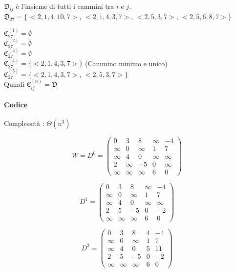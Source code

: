 \documentclass[tikz]{article}
\let\oldparagraph\paragraph
\renewcommand{\paragraph}[1]{\oldparagraph{#1}\mbox{}}
\begin{document}
{{$\mathfrak{D}_{ij}$ è l'insieme di tutti i cammini tra $i$ e $j$. \\
$\mathfrak{D}_{27} = \{\,<2,1,4,10,7>,\,<2,1,4,3,7>,\, <2,5,3,7>,\, <2,5,6,8,7>\}$ 

$\mathfrak{C}_{27}^{(1)} = \emptyset$ \\ 
$\mathfrak{C}_{27}^{(2)} = \emptyset$ \\ 
$\mathfrak{C}_{27}^{(3)} = \emptyset$ \\ 
$\mathfrak{C}_{27}^{(4)} = \{<2,1,4,3,7>\}$ (Cammino minimo e unico)\\ 
$\mathfrak{C}_{27}^{(5)} = \{<2,1,4,3,7>,\, <2,5,3,7>\}$ \\ 
Quindi $\mathfrak{C}_{ij}^{(n)} = \mathfrak{D}$ \\ 


\paragraph{Codice}




Complessità : $\Theta(n^3)$


\[
W = D^0 = 
 \begin{pmatrix}
  0 & 3 & 8 & \infty & -4 \\ 
  \infty & 0 & \infty & 1 & 7 \\ 
  \infty & 4 & 0 & \infty & \infty \\ 
  2 & \infty & -5 & 0 & \infty \\ 
  \infty & \infty & \infty & 6 & 0
 \end{pmatrix}
\]

\[
D^1 = 
 \begin{pmatrix}
  0 & 3 & 8 & \infty & -4 \\ 
  \infty & 0 & \infty & 1 & 7 \\ 
  \infty & 4 & 0 & \infty & \infty \\ 
  2 & 5 & -5 & 0 & -2 \\ 
  \infty & \infty & \infty & 6 & 0
 \end{pmatrix}
\]

\[
D^2 = 
 \begin{pmatrix}
  0 & 3 & 8 & 4 & -4 \\ 
  \infty & 0 & \infty & 1 & 7 \\ 
  \infty & 4 & 0 & 5 & 11 \\ 
  2 & 5 & -5 & 0 & -2 \\ 
  \infty & \infty & \infty & 6 & 0
 \end{pmatrix}
\]

}}
\end{document}

